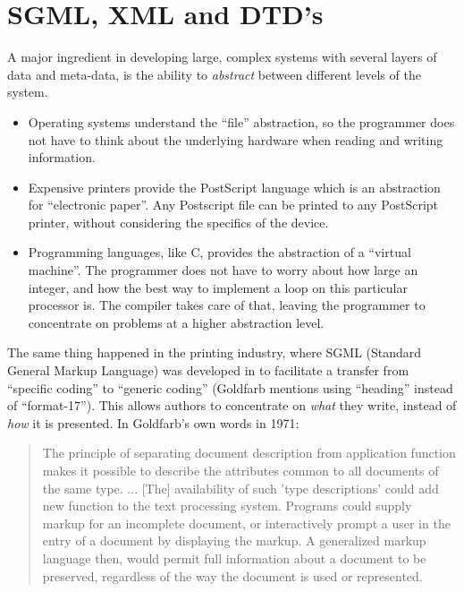 
\chapter{SGML, XML and DTD's}
\label{cha:sgml-xml-and-dtd's}

A major ingredient in developing large, complex systems with several
layers of data and meta-data, is the ability to \textit{abstract}
between different levels of the system.

\begin{itemize}
\item Operating systems understand the ``file'' abstraction, so the
  programmer does not have to think about the underlying hardware when
  reading and writing information.
\item Expensive printers provide the PostScript language which is an
  abstraction for ``electronic paper''.  Any Postscript file can be
  printed to any PostScript printer, without considering the specifics
  of the device.
\item Programming languages, like C, provides the abstraction of a
  ``virtual machine''.  The programmer does not have to worry about
  how large an integer, and how the best way to implement a loop on
  this particular processor is.  The compiler takes care of that,
  leaving the programmer to concentrate on problems at a higher
  abstraction level.
\end{itemize}



The same thing happened in the printing industry, where SGML (Standard
General Markup Language) was developed in
 to facilitate a transfer from ``specific coding''
to ``generic coding'' (Goldfarb mentions using ``heading'' instead of
``format-17'').  This allows authors to concentrate on \textit{what}
they write, instead of \textit{how} it is presented.  In Goldfarb's
own words in 1971:

\begin{quote}
  The principle of separating document description from application
  function makes it possible to describe the attributes common to all
  documents of the same type. ... [The] availability of such 'type
  descriptions' could add new function to the text processing system.
  Programs could supply markup for an incomplete document, or
  interactively prompt a user in the entry of a document by displaying
  the markup. A generalized markup language then, would permit full
  information about a document to be preserved, regardless of the way
  the document is used or represented.
\end{quote}

